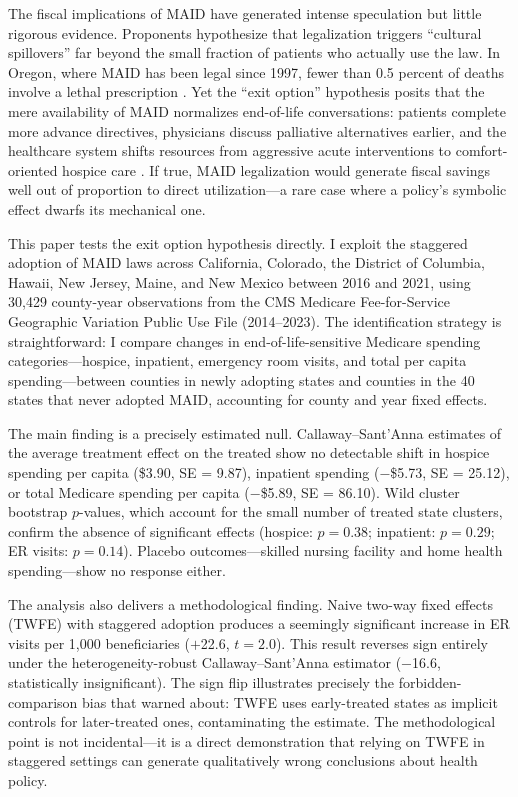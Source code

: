 \documentclass[12pt]{article}
\begin{document}
The fiscal implications of MAID have generated intense speculation but little rigorous evidence. Proponents hypothesize that legalization triggers ``cultural spillovers'' far beyond the small fraction of patients who actually use the law. In Oregon, where MAID has been legal since 1997, fewer than 0.5 percent of deaths involve a lethal prescription \citep{oha2023}. Yet the ``exit option'' hypothesis posits that the mere availability of MAID normalizes end-of-life conversations: patients complete more advance directives, physicians discuss palliative alternatives earlier, and the healthcare system shifts resources from aggressive acute interventions to comfort-oriented hospice care \citep{emanuel2016}. If true, MAID legalization would generate fiscal savings well out of proportion to direct utilization---a rare case where a policy's symbolic effect dwarfs its mechanical one.

This paper tests the exit option hypothesis directly. I exploit the staggered adoption of MAID laws across California, Colorado, the District of Columbia, Hawaii, New Jersey, Maine, and New Mexico between 2016 and 2021, using 30,429 county-year observations from the CMS Medicare Fee-for-Service Geographic Variation Public Use File (2014--2023). The identification strategy is straightforward: I compare changes in end-of-life-sensitive Medicare spending categories---hospice, inpatient, emergency room visits, and total per capita spending---between counties in newly adopting states and counties in the 40 states that never adopted MAID, accounting for county and year fixed effects.

The main finding is a precisely estimated null. Callaway--Sant'Anna estimates of the average treatment effect on the treated show no detectable shift in hospice spending per capita (\$3.90, SE = 9.87), inpatient spending ($-$\$5.73, SE = 25.12), or total Medicare spending per capita ($-$\$5.89, SE = 86.10). Wild cluster bootstrap $p$-values, which account for the small number of treated state clusters, confirm the absence of significant effects (hospice: $p = 0.38$; inpatient: $p = 0.29$; ER visits: $p = 0.14$). Placebo outcomes---skilled nursing facility and home health spending---show no response either.

The analysis also delivers a methodological finding. Naive two-way fixed effects (TWFE) with staggered adoption produces a seemingly significant increase in ER visits per 1,000 beneficiaries ($+$22.6, $t = 2.0$). This result reverses sign entirely under the heterogeneity-robust Callaway--Sant'Anna estimator ($-$16.6, statistically insignificant). The sign flip illustrates precisely the forbidden-comparison bias that \citet{goodman2021} warned about: TWFE uses early-treated states as implicit controls for later-treated ones, contaminating the estimate. The methodological point is not incidental---it is a direct demonstration that relying on TWFE in staggered settings can generate qualitatively wrong conclusions about health policy.
\end{document}
